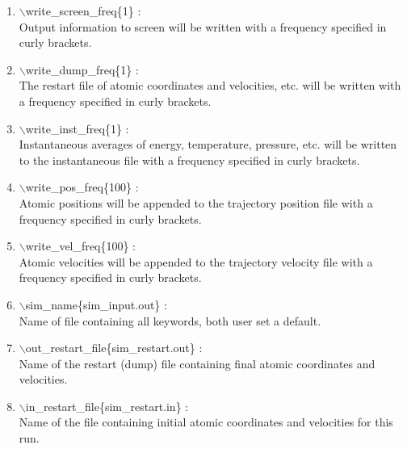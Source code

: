 \begin{itemize}
\begin{enumerate}
 \vspace{0.15in} \Large
 \item   $\backslash$write\_screen\_freq\{1\} : \\
  \large
   Output information to screen will be written with a frequency specified
   in curly brackets.

 \vspace{0.15in} \Large
 \item   $\backslash$write\_dump\_freq\{1\} : \\
   \large
     The restart file of atomic coordinates and velocities, etc. will be
     written with a frequency specified in curly brackets.

 \vspace{0.15in}\Large
 \item   $\backslash$write\_inst\_freq\{1\} : \\
   \large
     Instantaneous averages of energy, temperature, pressure, etc. will be 
     written to the instantaneous file with a frequency specified in curly 
     brackets.

 \vspace{0.15in} \Large
 \item   $\backslash$write\_pos\_freq\{100\} : \\
  \large
    Atomic positions will be appended to the trajectory position file with
    a frequency specified in curly brackets.

 \vspace{0.15in} \Large
 \item   $\backslash$write\_vel\_freq\{100\} : \\
  \large
    Atomic velocities will be appended to the trajectory velocity file with
    a frequency specified in curly brackets.

 \vspace{0.15in} \Large
 \item   $\backslash$sim\_name\{sim\_input.out\} : \\
   \large
     Name of file containing all keywords, both user set a default.

 \vspace{0.15in} \Large
 \item   $\backslash$out\_restart\_file\{sim\_restart.out\} : \\
   \large Name of the restart (dump) file containing final atomic 
          coordinates and velocities.

 \vspace{0.15in} \Large
 \item   $\backslash$in\_restart\_file\{sim\_restart.in\} : \\
   \large
     Name of the file containing initial atomic coordinates and
     velocities for this run.



\end{enumerate}
\end{itemize}
